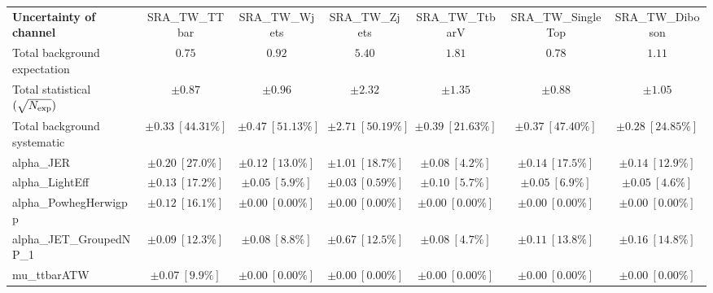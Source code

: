 
\begin{sidewaystable}
\begin{center}
\setlength{\tabcolsep}{0.0pc}
\begin{tabular*}{\textwidth}{@{\extracolsep{\fill}}lcccccc}
\noalign{\smallskip}\hline\noalign{\smallskip}
{\bf Uncertainty of channel}                                    & SRA\_TW\_TTbar            & SRA\_TW\_Wjets            & SRA\_TW\_Zjets            & SRA\_TW\_TtbarV            & SRA\_TW\_SingleTop            & SRA\_TW\_Diboson            \\
\noalign{\smallskip}\hline\noalign{\smallskip}
Total background expectation             &  $0.75$        &  $0.92$        &  $5.40$        &  $1.81$        &  $0.78$        &  $1.11$       \\
\noalign{\smallskip}\hline\noalign{\smallskip}
Total statistical $(\sqrt{N_{\rm exp}})$              & $\pm 0.87$        & $\pm 0.96$        & $\pm 2.32$        & $\pm 1.35$        & $\pm 0.88$        & $\pm 1.05$       \\
Total background systematic               & $\pm 0.33\ [44.31\%] $        & $\pm 0.47\ [51.13\%] $        & $\pm 2.71\ [50.19\%] $        & $\pm 0.39\ [21.63\%] $        & $\pm 0.37\ [47.40\%] $        & $\pm 0.28\ [24.85\%] $             \\
\noalign{\smallskip}\hline\noalign{\smallskip}
\noalign{\smallskip}\hline\noalign{\smallskip}
alpha\_JER         & $\pm 0.20\ [27.0\%] $          & $\pm 0.12\ [13.0\%] $          & $\pm 1.01\ [18.7\%] $          & $\pm 0.08\ [4.2\%] $          & $\pm 0.14\ [17.5\%] $          & $\pm 0.14\ [12.9\%] $       \\
alpha\_LightEff         & $\pm 0.13\ [17.2\%] $          & $\pm 0.05\ [5.9\%] $          & $\pm 0.03\ [0.59\%] $          & $\pm 0.10\ [5.7\%] $          & $\pm 0.05\ [6.9\%] $          & $\pm 0.05\ [4.6\%] $       \\
alpha\_PowhegHerwigpp         & $\pm 0.12\ [16.1\%] $          & $\pm 0.00\ [0.00\%] $          & $\pm 0.00\ [0.00\%] $          & $\pm 0.00\ [0.00\%] $          & $\pm 0.00\ [0.00\%] $          & $\pm 0.00\ [0.00\%] $       \\
alpha\_JET\_GroupedNP\_1         & $\pm 0.09\ [12.3\%] $          & $\pm 0.08\ [8.8\%] $          & $\pm 0.67\ [12.5\%] $          & $\pm 0.08\ [4.7\%] $          & $\pm 0.11\ [13.8\%] $          & $\pm 0.16\ [14.8\%] $       \\
mu\_ttbarATW         & $\pm 0.07\ [9.9\%] $          & $\pm 0.00\ [0.00\%] $          & $\pm 0.00\ [0.00\%] $          & $\pm 0.00\ [0.00\%] $          & $\pm 0.00\ [0.00\%] $          & $\pm 0.00\ [0.00\%] $       \\

\end{tabular*}
\end{center}
\end{sidewaystable}
